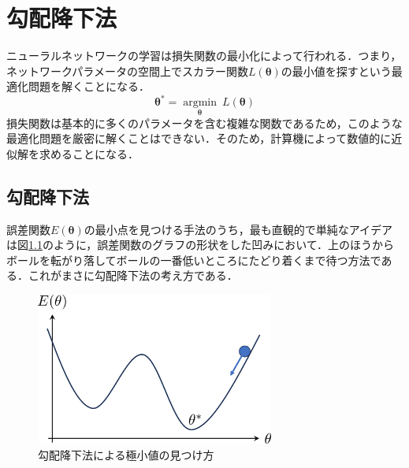 \documentclass[a4paper,11pt]{jsreport}
\begin{document}
\section{勾配降下法}
ニューラルネットワークの学習は損失関数の最小化によって行われる．つまり，ネットワークパラメータの空間上でスカラー関数$L(\bm{\theta})$の最小値を探すという最適化問題を解くことになる．
\begin{equation}
  \bm{\theta}^* = \underset{\bm{\theta}} {\operatorname{argmin}} \ L(\bm{\theta})
\end{equation}
損失関数は基本的に多くのパラメータを含む複雑な関数であるため，このような最適化問題を厳密に解くことはできない．そのため，計算機によって数値的に近似解を求めることになる．\par

\subsection{勾配降下法}
誤差関数$E(\bm{\theta})$の最小点を見つける手法のうち，最も直観的で単純なアイデアは図\ref{}のように，誤差関数のグラフの形状をした凹みにおいて．上のほうからボールを転がり落してボールの一番低いところにたどり着くまで待つ方法である．これがまさに勾配降下法の考え方である．\par

\begin{figure}
  \begin{center}
    \includegraphics[height=5cm]{image/gradient_decent.png}
    \caption{勾配降下法による極小値の見つけ方}
  \end{center}
\end{figure}
\end{document}
